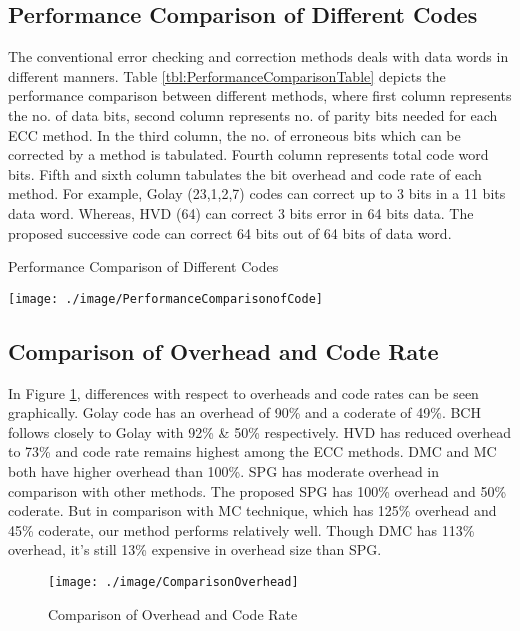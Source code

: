 \documentclass[12pt,a4paper]{report}
\begin{document}
\subsection{Performance Comparison of Different Codes}
The conventional error checking and correction methods deals with data words in different manners. Table \ref{tbl:PerformanceComparisonTable} depicts the performance comparison between different methods, where first column represents the no. of data bits, second column represents no. of parity bits needed for each ECC method. In the third column, the no. of erroneous bits which can be corrected by a method is tabulated. Fourth column represents total code word bits. Fifth and sixth column tabulates the bit overhead and code rate of each method. For example, Golay (23,1,2,7) codes can correct up to 3 bits in a 11 bits data word. Whereas, HVD (64) can correct 3 bits error in 64 bits data. The proposed successive code can correct 64 bits out of 64 bits of data word.\\

 \begin{table}[!hb]
 \centering
 \caption{Performance Comparison of Different Codes}
 \label{tbl:PerformanceComparisonTable}
 \texttt{[image: ./image/PerformanceComparisonofCode]}
 \end{table}
 
\cleardoublepage
\subsection{Comparison of Overhead and Code Rate}
In Figure \ref{fig:ComparisonOverhead}, differences with respect to overheads and code rates can be seen graphically. Golay code has an overhead of 90\% and a coderate of 49\%. BCH follows closely to Golay with 92\% \& 50\% respectively. HVD has reduced overhead to 73\% and code rate remains highest among the ECC methods. DMC and MC both have higher overhead than 100\%. SPG has moderate overhead in comparison with other methods. 
The proposed SPG has 100\% overhead and 50\% coderate. But in comparison with MC technique, which has 125\% overhead and 45\% coderate, our method performs relatively well. Though DMC has 113\% overhead, it’s still 13\% expensive in overhead size than SPG.\\

 \begin{figure}[!hb]
 \centering
 \texttt{[image: ./image/ComparisonOverhead]}
 \caption{Comparison of Overhead and Code Rate}
 \label{fig:ComparisonOverhead}
 \end{figure}
\end{document}
